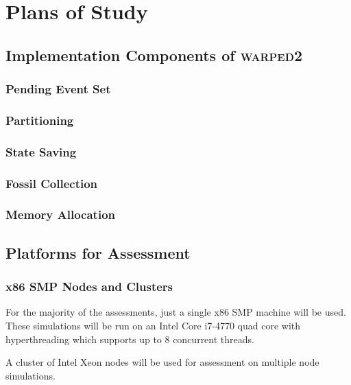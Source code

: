 \documentclass[11pt]{book}
\begin{document}
\chapter{Plans of Study}\label{plans_of_study}

\section{Implementation Components of \textsc{warped2}}

\subsection{Pending Event Set}

\subsection{Partitioning}

\subsection{State Saving}

\subsection{Fossil Collection}

\subsection{Memory Allocation}

\section{Platforms for Assessment}

\subsection{x86 SMP Nodes and Clusters}

For the majority of the assessments, just a single x86 SMP machine will be used. These
simulations will be run on an Intel Core i7-4770 quad core with hyperthreading which
supports up to 8 concurrent threads.

A cluster of Intel Xeon nodes will be used for assessment on multiple node simulations.

\pagebreak
\end{document}
